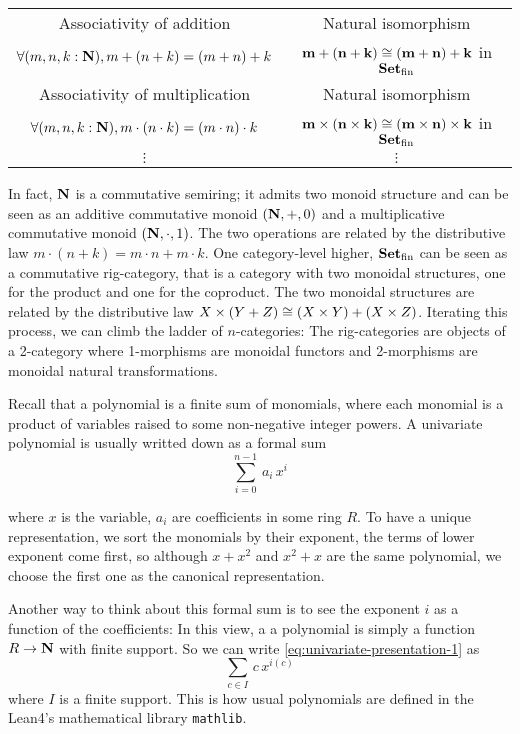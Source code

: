 \begin{table}[h]
\begin{tabular}{|c|c|}
      \hline
      Associativity of addition  &     Natural isomorphism  \\
      $\forall (m, n, k : \mathbf{N}), m + (n + k) = (m + n) + k$ & $\mathbf{m} + (\mathbf{n} + \mathbf{k}) \cong (\mathbf{m} + \mathbf{n}) + \mathbf{k}$ in $\mathbf{Set}_\mathrm{fin}$ \\
      \hline
      Associativity of multiplication  &     Natural isomorphism  \\
      $\forall (m, n, k : \mathbf{N}), m \cdot (n \cdot k) = (m \cdot n) \cdot k$ & $\mathbf{m} \times (\mathbf{n} \times \mathbf{k}) \cong (\mathbf{m} \times \mathbf{n}) \times \mathbf{k}$ in $\mathbf{Set}_\mathrm{fin}$ \\
      \hline
      $\vdots$ & $\vdots$ \\
      \hline
  \end{tabular}
\end{table}

In fact, $\mathbf{N}$ is a commutative semiring; it admits two monoid structure and can be seen as an additive commutative monoid $(\mathbf{N}, +, 0)$ and a multiplicative commutative monoid $(\mathbf{N}, \cdot, 1)$. The two operations are related by the distributive law $m \cdot (n + k) = m \cdot n + m \cdot k$. One category-level higher, $\mathbf{Set}_\mathrm{fin}$ can be seen as a commutative rig-category, that is a category with two monoidal structures, one for the product and one for the coproduct. The two monoidal structures are related by the distributive law $X \times (Y + Z) \cong (X \times Y) + (X \times Z)$. Iterating this process, we can climb the ladder of $n$-categories: The rig-categories are objects of a 2-category where 1-morphisms are monoidal functors and 2-morphisms are monoidal natural transformations.

Recall that a polynomial is a finite sum of monomials, where each monomial is a product of variables raised to some non-negative integer powers. A univariate polynomial is usually writted down as a formal sum
\begin{equation}
\label{eq:univariate-presentation-1}
\sum_{i=0}^{n - 1} \, a_i \, x^i
\end{equation}

where $x$ is the variable, $a_i$ are coefficients in some ring $R$. To have a unique representation, we sort the monomials by their exponent, the terms of lower exponent come first, so although $x + x^ 2$ and $x^2 + x$ are the same polynomial, we choose the first one as the canonical representation.

Another way to think about this formal sum is to see the exponent $i$ as a function of the coefficients: In this view, a a polynomial is simply a function $R \to \mathbf{N}$ with finite support. So we can write \ref{eq:univariate-presentation-1} as
\begin{equation}
\label{eq:univariate-presentation-2}
\sum_{c \in I} \, c \, x^{i(c)}
\end{equation}
where $I$ is a finite support. This is how usual polynomials are defined in the Lean4's mathematical library \texttt{mathlib}.

